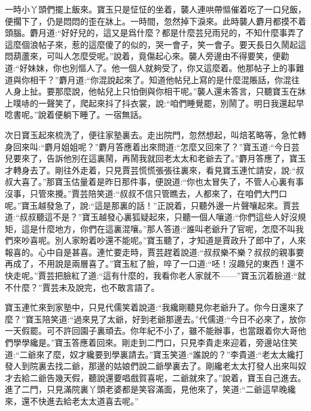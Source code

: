 \begin{parag}
    一時小丫頭們擺上飯來。寶玉只是怔怔的坐着，襲人連哄帶慪催着吃了一口兒飯，便擱下了，仍是悶悶的歪在牀上。一時間，忽然掉下淚來。此時襲人麝月都摸不着頭腦。麝月道:“好好兒的，這又是爲什麼？都是什麼芸兒雨兒的，不知什麼事弄了這麼個浪帖子來，惹的這麼傻了的似的，哭一會子，笑一會子。要天長日久鬧起這悶葫蘆來，可叫人怎麼受呢。”說着，竟傷起心來。襲人旁邊由不得要笑，便勸道:“好妹妹，你也別慪人了。他一個人就夠受了，你又這麼着。他那帖子上的事難道與你相干？”麝月道:“你混說起來了。知道他帖兒上寫的是什麼混賬話，你混往人身上扯。要那麼說，他帖兒上只怕倒與你相干呢。”襲人還未答言，只聽寶玉在牀上噗哧的一聲笑了，爬起來抖了抖衣裳，說:“咱們睡覺罷，別鬧了。明日我還起早唸書呢。”說着便躺下睡了。一宿無話。
\end{parag}


\begin{parag}
    次日寶玉起來梳洗了，便往家塾裏去。走出院門，忽然想起，叫焙茗略等，急忙轉身回來叫:“麝月姐姐呢？”麝月答應着出來問道:“怎麼又回來了？”寶玉道:“今日芸兒要來了，告訴他別在這裏鬧，再鬧我就回老太太和老爺去了。”麝月答應了，寶玉才轉身去了。剛往外走着，只見賈芸慌慌張張往裏來，看見寶玉連忙請安，說:“叔叔大喜了。”那寶玉估量着是昨日那件事，便說道:“你也太冒失了，不管人心裏有事沒事，只管來攪。”賈芸陪笑道:“叔叔不信只管瞧去，人都來了，在咱們大門口呢。”寶玉越發急了，說:“這是那裏的話！”正說着，只聽外邊一片聲嚷起來。賈芸道:“叔叔聽這不是？”寶玉越發心裏狐疑起來，只聽一個人嚷道:“你們這些人好沒規矩，這是什麼地方，你們在這裏混嚷。”那人答道:“誰叫老爺升了官呢，怎麼不叫我們來吵喜呢。別人家盼着吵還不能呢。”寶玉聽了，才知道是賈政升了郎中了，人來報喜的。心中自是甚喜。連忙要走時，賈芸趕着說道:“叔叔樂不樂？叔叔的親事要再成了，不用說是兩層喜了。”寶玉紅了臉，啐了一口道:“呸！沒趣兒的東西！還不快走呢。”賈芸把臉紅了道:“這有什麼的，我看你老人家就不——”寶玉沉着臉道:“就不什麼？”賈芸未及說完，也不敢言語了。
\end{parag}


\begin{parag}
    寶玉連忙來到家塾中，只見代儒笑着說道:“我纔剛聽見你老爺升了。你今日還來了麼？”寶玉陪笑道:“過來見了太爺，好到老爺那邊去。”代儒道:“今日不必來了，放你一天假罷。可不許回園子裏頑去。你年紀不小了，雖不能辦事，也當跟着你大哥他們學學纔是。”寶玉答應着回來。剛走到二門口，只見李貴走來迎着，旁邊站住笑道:“二爺來了麼，奴才纔要到學裏請去。”寶玉笑道:“誰說的？”李貴道:“老太太纔打發人到院裏去找二爺，那邊的姑娘們說二爺學裏去了。剛纔老太太打發人出來叫奴才去給二爺告幾天假，聽說還要唱戲賀喜呢，二爺就來了。”說着，寶玉自己進去。進了二門，只見滿院裏丫頭老婆都是笑容滿面，見他來了，笑道:“二爺這早晚纔來，還不快進去給老太太道喜去呢。”
\end{parag}


